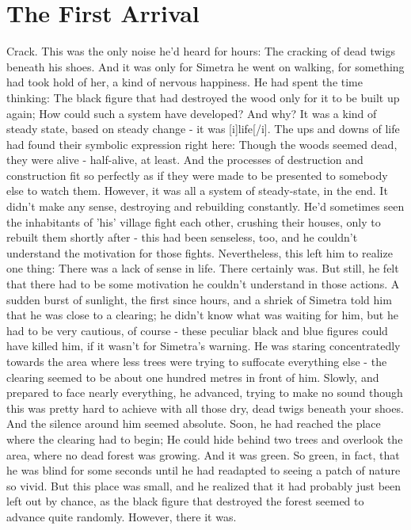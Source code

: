 \chapter{The First Arrival}
\label{cha:first-arrival}
Crack. 
This was the only noise he'd heard for hours: The cracking of dead twigs beneath his shoes. And it was only for Simetra he went on walking, for something had took hold of her, a kind of nervous happiness. 
He had spent the time thinking: The black figure that had destroyed the wood only for it to be built up again; How could such a system have developed? And why? 
It was a kind of steady state, based on steady change - it was [i]life[/i]. The ups and downs of life had found their symbolic expression right here: Though the woods seemed dead, they were alive - half-alive, at least. And the processes of destruction and construction fit so perfectly as if they were made to be presented to somebody else to watch them. 
However, it was all a system of steady-state, in the end. It didn't make any sense, destroying and rebuilding constantly. He'd sometimes seen the inhabitants of 'his' village fight each other, crushing their houses, only to rebuilt them shortly after - this had been senseless, too, and he couldn't understand the motivation for those fights. 
Nevertheless, this left him to realize one thing: There was a lack of sense in life. 
There certainly was. 
But still, he felt that there had to be some motivation he couldn't understand in those actions. 
A sudden burst of sunlight, the first since hours, and a shriek of Simetra told him that he was close to a clearing; he didn't know what was waiting for him, but he had to be very cautious, of course - these peculiar black and blue figures could have killed him, if it wasn't for Simetra's warning. 
He was staring concentratedly towards the area where less trees were trying to suffocate everything else - the clearing seemed to be about one hundred metres in front of him. 
Slowly, and prepared to face nearly everything, he advanced, trying to make no sound though this was pretty hard to achieve with all those dry, dead twigs beneath your shoes. And the silence around him seemed absolute. 
Soon, he had reached the place where the clearing had to begin; He could hide behind two trees and overlook the area, where no dead forest was growing. And it was green. 
So green, in fact, that he was blind for some seconds until he had readapted to seeing a patch of nature so vivid. But this place was small, and he realized that it had probably just been left out by chance, as the black figure that destroyed the forest seemed to advance quite randomly. However, there it was. 

